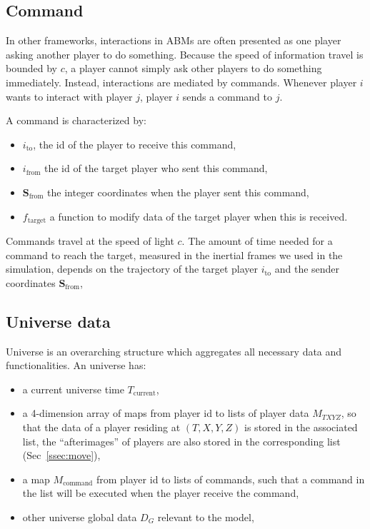 \documentclass{svproc}
\begin{document}
\subsection{Command}

In other frameworks, interactions in ABMs are often presented as one player asking another player to do something.
Because the speed of information travel is bounded by $c$,
a player cannot simply ask other players to do something immediately.
Instead, interactions are mediated by commands.
Whenever player $i$ wants to interact with player $j$, 
player $i$ sends a command to $j$. 

A command is characterized by:
\begin{itemize}
  \item $i_{\textrm{to}}$, the id of the player to receive this command,
  \item $i_{\textrm{from}}$ the id of the target player who sent this command,
  \item $\textbf{S}_{\textrm{from}}$ the integer coordinates when the player sent this command,
  \item $f_{\text{target}}$ a function to modify data of the target player when this is received.
\end{itemize}

Commands travel at the speed of light $c$.
The amount of time needed for a command to reach the target, 
measured in the inertial frames we used in the simulation,
depends on the trajectory of the target player $i_{\textrm{to}}$ and the sender coordinates $\textbf{S}_{\textrm{from}}$,

\subsection{Universe data}

Universe is an overarching structure which aggregates all necessary data and functionalities.
An universe has:
\begin{itemize}
  \item a current universe time $T_{\textrm{current}}$,
  \item a 4-dimension array of maps from player id to lists of player data $M_{TXYZ}$,
        so that the data of a player residing at $(T, X, Y, Z)$ is stored in the associated list, 
        the ``afterimages'' of players are also stored in the corresponding list (Sec~\ref{ssec:move}),
  \item a map $M_{\textrm{command}}$ from player id to lists of commands,
        such that a command in the list will be executed when the player receive the command,
  \item other universe global data $D_G$ relevant to the model,
\end{itemize}
\end{document}
